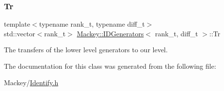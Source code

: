 \subsubsection{\texorpdfstring{Tr}{Tr}}
{\footnotesize\ttfamily template$<$typename rank\+\_\+t, typename diff\+\_\+t$>$ \\
std\+::vector$<$rank\+\_\+t$>$ \hyperlink{classMackey_1_1IDGenerators}{Mackey\+::\+I\+D\+Generators}$<$ rank\+\_\+t, diff\+\_\+t $>$\+::Tr}



The transfers of the lower level generators to our level. 



The documentation for this class was generated from the following file\+:\begin{DoxyCompactItemize}
\item 
Mackey/\hyperlink{Identify_8h}{Identify.\+h}\end{DoxyCompactItemize}
